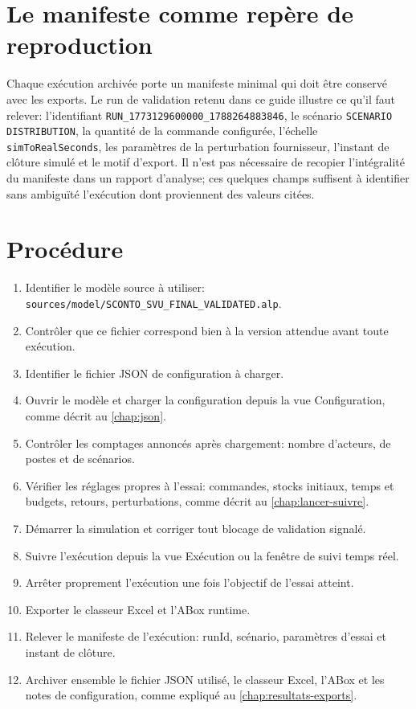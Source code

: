 \section{Le manifeste comme repère de reproduction}

\begin{sloppypar}
Chaque exécution archivée porte un manifeste minimal qui doit être conservé avec les exports. Le run de validation retenu dans ce guide illustre ce qu'il faut relever: l'identifiant \texttt{RUN\_1773129600000\_1788264883846}, le scénario \texttt{SCENARIO DISTRIBUTION}, la quantité de la commande configurée, l'échelle \texttt{simToRealSeconds}, les paramètres de la perturbation fournisseur, l'instant de clôture simulé et le motif d'export. Il n'est pas nécessaire de recopier l'intégralité du manifeste dans un rapport d'analyse; ces quelques champs suffisent à identifier sans ambiguïté l'exécution dont proviennent des valeurs citées.
\end{sloppypar}

\section{Procédure}

\begin{enumerate}
  \item Identifier le modèle source à utiliser: \texttt{sources/model/SCONTO\_SVU\_FINAL\_VALIDATED.alp}.
  \item Contrôler que ce fichier correspond bien à la version attendue avant toute exécution.
  \item Identifier le fichier JSON de configuration à charger.
  \item Ouvrir le modèle et charger la configuration depuis la vue Configuration, comme décrit au \cref{chap:json}.
  \item Contrôler les comptages annoncés après chargement: nombre d'acteurs, de postes et de scénarios.
  \item Vérifier les réglages propres à l'essai: commandes, stocks initiaux, temps et budgets, retours, perturbations, comme décrit au \cref{chap:lancer-suivre}.
  \item Démarrer la simulation et corriger tout blocage de validation signalé.
  \item Suivre l'exécution depuis la vue Exécution ou la fenêtre de suivi temps réel.
  \item Arrêter proprement l'exécution une fois l'objectif de l'essai atteint.
  \item Exporter le classeur Excel et l'ABox runtime.
  \item Relever le manifeste de l'exécution: runId, scénario, paramètres d'essai et instant de clôture.
  \item Archiver ensemble le fichier JSON utilisé, le classeur Excel, l'ABox et les notes de configuration, comme expliqué au \cref{chap:resultats-exports}.
\end{enumerate}

